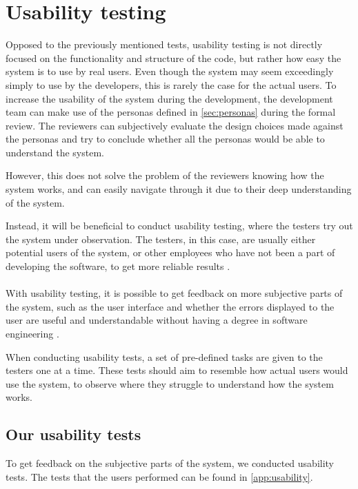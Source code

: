 \section{Usability testing}
Opposed to the previously mentioned tests, usability testing is not directly focused on the functionality and structure of the code, but rather how easy the system is to use by real users.
Even though the system may seem exceedingly simply to use by the developers, this is rarely the case for the actual users.
To increase the usability of the system during the development, the development team can make use of the personas defined in \autoref{sec:personas} during the formal review.
The reviewers can subjectively evaluate the design choices made against the personas and try to conclude whether all the personas would be able to understand the system.

However, this does not solve the problem of the reviewers knowing how the system works, and can easily navigate through it due to their deep understanding of the system.

Instead, it will be beneficial to conduct usability testing, where the testers try out the system under observation.
The testers, in this case, are usually either potential users of the system, or other employees who have not been a part of developing the software, to get more reliable results \cite{SoftwareTesting}.
\\\\
With usability testing, it is possible to get feedback on more subjective parts of the system, such as the user interface and whether the errors displayed to the user are useful and understandable without having a degree in software engineering \cite{SoftwareTesting}.

When conducting usability tests, a set of pre-defined tasks are given to the testers one at a time.
These tests should aim to resemble how actual users would use the system, to observe where they struggle to understand how the system works.

\subsection{Our usability tests}
To get feedback on the subjective parts of the system, we conducted usability tests.
The tests that the users performed can be found in \autoref{app:usability}.

